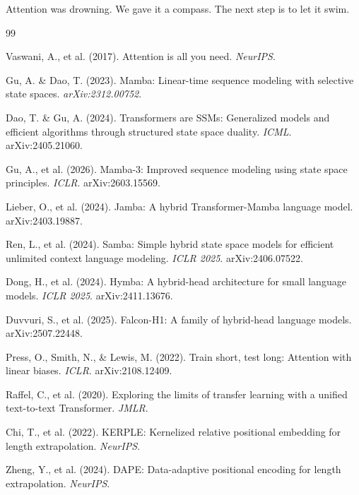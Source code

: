 \documentclass[11pt]{article}
\begin{document}
Attention was drowning. We gave it a compass. The next step is to let it swim.


\begin{thebibliography}{99}

Vaswani, A., et al. (2017). Attention is all you need. \emph{NeurIPS}.

Gu, A. \& Dao, T. (2023). Mamba: Linear-time sequence modeling with selective state spaces. \emph{arXiv:2312.00752}.

Dao, T. \& Gu, A. (2024). Transformers are SSMs: Generalized models and efficient algorithms through structured state space duality. \emph{ICML}. arXiv:2405.21060.

Gu, A., et al. (2026). Mamba-3: Improved sequence modeling using state space principles. \emph{ICLR}. arXiv:2603.15569.

Lieber, O., et al. (2024). Jamba: A hybrid Transformer-Mamba language model. arXiv:2403.19887.

Ren, L., et al. (2024). Samba: Simple hybrid state space models for efficient unlimited context language modeling. \emph{ICLR 2025}. arXiv:2406.07522.

Dong, H., et al. (2024). Hymba: A hybrid-head architecture for small language models. \emph{ICLR 2025}. arXiv:2411.13676.

Duvvuri, S., et al. (2025). Falcon-H1: A family of hybrid-head language models. arXiv:2507.22448.

Press, O., Smith, N., \& Lewis, M. (2022). Train short, test long: Attention with linear biases. \emph{ICLR}. arXiv:2108.12409.

Raffel, C., et al. (2020). Exploring the limits of transfer learning with a unified text-to-text Transformer. \emph{JMLR}.

Chi, T., et al. (2022). KERPLE: Kernelized relative positional embedding for length extrapolation. \emph{NeurIPS}.

Zheng, Y., et al. (2024). DAPE: Data-adaptive positional encoding for length extrapolation. \emph{NeurIPS}.


\end{thebibliography}
\end{document}
